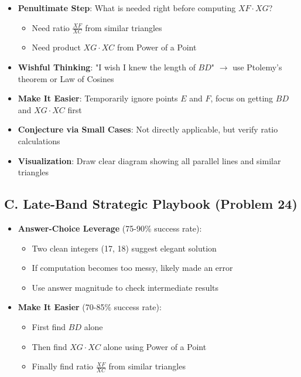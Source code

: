 \documentclass[]{article}
\begin{document}
\begin{strategicbox}
\begin{itemize}[leftmargin=*]
    \item \textbf{Penultimate Step}: What is needed right before computing $XF \cdot XG$?
    \begin{itemize}
        \item Need ratio $\frac{XF}{XC}$ from similar triangles
        \item Need product $XG \cdot XC$ from Power of a Point
    \end{itemize}
    
    \item \textbf{Wishful Thinking}: "I wish I knew the length of $BD$" $\rightarrow$ use Ptolemy's theorem or Law of Cosines
    
    \item \textbf{Make It Easier}: Temporarily ignore points $E$ and $F$, focus on getting $BD$ and $XG \cdot XC$ first
    
    \item \textbf{Conjecture via Small Cases}: Not directly applicable, but verify ratio calculations
    
    \item \textbf{Visualization}: Draw clear diagram showing all parallel lines and similar triangles
\end{itemize}

\subsection*{C. Late-Band Strategic Playbook (Problem 24)}
\begin{itemize}[leftmargin=*]
    \item \textbf{Answer-Choice Leverage} (75-90\% success rate):
    \begin{itemize}
        \item Two clean integers (17, 18) suggest elegant solution
        \item If computation becomes too messy, likely made an error
        \item Use answer magnitude to check intermediate results
    \end{itemize}
    
    \item \textbf{Make It Easier} (70-85\% success rate):
    \begin{itemize}
        \item First find $BD$ alone
        \item Then find $XG \cdot XC$ alone using Power of a Point
        \item Finally find ratio $\frac{XF}{XC}$ from similar triangles
    \end{itemize}
    

\end{itemize}
\end{strategicbox}
\end{document}
